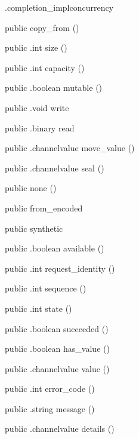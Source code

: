 \begin{CrexxClass}{.completion\_impl}{concurrency}
\begin{Members}
    \Factory
      {public}
      {copy\_from}
      {()}

    \Method
      {public}
      {.int}
      {size}
      {()}

    \Method
      {public}
      {.int}
      {capacity}
      {()}

    \Method
      {public}
      {.boolean}
      {mutable}
      {()}

    \Method
      {public}
      {.void}
      {write}
      {}

    \Method
      {public}
      {.binary}
      {read}
      {}

    \Method
      {public}
      {.channelvalue}
      {move\_value}
      {()}

    \Method
      {public}
      {.channelvalue}
      {seal}
      {()}

    \Factory
      {public}
      {none}
      {()}

    \Factory
      {public}
      {from\_encoded}
      {}

    \Factory
      {public}
      {synthetic}
      {}

    \Method
      {public}
      {.boolean}
      {available}
      {()}

    \Method
      {public}
      {.int}
      {request\_identity}
      {()}

    \Method
      {public}
      {.int}
      {sequence}
      {()}

    \Method
      {public}
      {.int}
      {state}
      {()}

    \Method
      {public}
      {.boolean}
      {succeeded}
      {()}

    \Method
      {public}
      {.boolean}
      {has\_value}
      {()}

    \Method
      {public}
      {.channelvalue}
      {value}
      {()}

    \Method
      {public}
      {.int}
      {error\_code}
      {()}

    \Method
      {public}
      {.string}
      {message}
      {()}

    \Method
      {public}
      {.channelvalue}
      {details}
      {()}

  \end{Members}
\end{CrexxClass}


